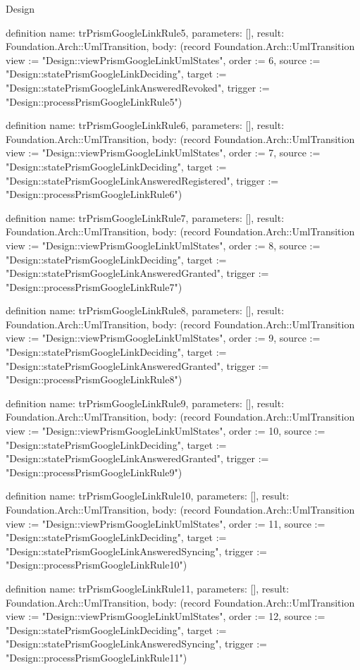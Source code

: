 \begin{lexlean}{Design}
\begin{semanticmodule}
definition{
  name: trPrismGoogleLinkRule5,
  parameters: [],
  result: Foundation.Arch::UmlTransition,
  body: (record Foundation.Arch::UmlTransition {view := "Design::viewPrismGoogleLinkUmlStates", order := 6, source := "Design::statePrismGoogleLinkDeciding", target := "Design::statePrismGoogleLinkAnsweredRevoked", trigger := "Design::processPrismGoogleLinkRule5"})
}

definition{
  name: trPrismGoogleLinkRule6,
  parameters: [],
  result: Foundation.Arch::UmlTransition,
  body: (record Foundation.Arch::UmlTransition {view := "Design::viewPrismGoogleLinkUmlStates", order := 7, source := "Design::statePrismGoogleLinkDeciding", target := "Design::statePrismGoogleLinkAnsweredRegistered", trigger := "Design::processPrismGoogleLinkRule6"})
}

definition{
  name: trPrismGoogleLinkRule7,
  parameters: [],
  result: Foundation.Arch::UmlTransition,
  body: (record Foundation.Arch::UmlTransition {view := "Design::viewPrismGoogleLinkUmlStates", order := 8, source := "Design::statePrismGoogleLinkDeciding", target := "Design::statePrismGoogleLinkAnsweredGranted", trigger := "Design::processPrismGoogleLinkRule7"})
}

definition{
  name: trPrismGoogleLinkRule8,
  parameters: [],
  result: Foundation.Arch::UmlTransition,
  body: (record Foundation.Arch::UmlTransition {view := "Design::viewPrismGoogleLinkUmlStates", order := 9, source := "Design::statePrismGoogleLinkDeciding", target := "Design::statePrismGoogleLinkAnsweredGranted", trigger := "Design::processPrismGoogleLinkRule8"})
}

definition{
  name: trPrismGoogleLinkRule9,
  parameters: [],
  result: Foundation.Arch::UmlTransition,
  body: (record Foundation.Arch::UmlTransition {view := "Design::viewPrismGoogleLinkUmlStates", order := 10, source := "Design::statePrismGoogleLinkDeciding", target := "Design::statePrismGoogleLinkAnsweredGranted", trigger := "Design::processPrismGoogleLinkRule9"})
}

definition{
  name: trPrismGoogleLinkRule10,
  parameters: [],
  result: Foundation.Arch::UmlTransition,
  body: (record Foundation.Arch::UmlTransition {view := "Design::viewPrismGoogleLinkUmlStates", order := 11, source := "Design::statePrismGoogleLinkDeciding", target := "Design::statePrismGoogleLinkAnsweredSyncing", trigger := "Design::processPrismGoogleLinkRule10"})
}

definition{
  name: trPrismGoogleLinkRule11,
  parameters: [],
  result: Foundation.Arch::UmlTransition,
  body: (record Foundation.Arch::UmlTransition {view := "Design::viewPrismGoogleLinkUmlStates", order := 12, source := "Design::statePrismGoogleLinkDeciding", target := "Design::statePrismGoogleLinkAnsweredSyncing", trigger := "Design::processPrismGoogleLinkRule11"})
}


\end{semanticmodule}
\end{lexlean}
